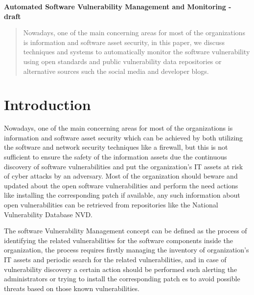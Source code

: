 \documentclass{llncs}
\begin{document}
\begin{flushleft}
 
\LARGE\bf Automated Software Vulnerability Management and Monitoring - draft 

\end{flushleft}

\newpage

\tableofcontents

\newpage


\begin{abstract}
Nowadays, one of the main concerning areas for most of the organizations is information and software asset security, in this paper, we discuss techniques and systems to automatically monitor the software vulnerability using open standards and public vulnerability data repositories or alternative sources such the social media and developer blogs. 
\end{abstract}

\section{Introduction}

\par Nowadays, one of the main concerning areas for most of the organizations is information and software asset security which can be achieved by both utilizing the software and network security techniques like a firewall, but this is not sufficient to ensure the safety of the information assets due the continuous discovery of software vulnerabilities and put the organization's IT assets at risk of cyber attacks by an adversary. Most of the organization should beware and updated about the open software vulnerabilities and perform the need actions like installing the corresponding patch if available, any such information about open vulnerabilities can be retrieved from repositories like the National Vulnerability Database NVD.
 
\par The software Vulnerability Management concept can be defined as the process of identifying the related vulnerabilities for the software components inside the organization, the process requires firstly managing the inventory of organization's IT assets and periodic search for the related vulnerabilities, and in case of vulnerability discovery a certain action should be performed such alerting the administrators or trying to install the corresponding patch es to avoid possible threats based on those known vulnerabilities.
         
\end{document}
